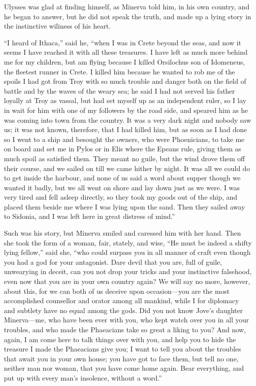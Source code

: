 Ulysses was glad at finding himself, as Minerva told him, in his own country,
and he began to answer, but he did not speak the truth, and made up a lying
story in the instinctive wiliness of his heart.

“I heard of Ithaca,” said he, “when I was in Crete beyond the seas, and now it
seems I have reached it with all these treasures. I have left as much more
behind me for my children, but am flying because I killed Orsilochus son of
Idomeneus, the fleetest runner in Crete. I killed him because he wanted to rob
me of the spoils I had got from Troy with so much trouble and danger both on
the field of battle and by the waves of the weary sea; he said I had not served
his father loyally at Troy as vassal, but had set myself up as an independent
ruler, so I lay in wait for him with one of my followers by the road side, and
speared him as he was coming into town from the country. It was a very dark
night and nobody saw us; it was not known, therefore, that I had killed him,
but as soon as I had done so I went to a ship and besought the owners, who were
Phoenicians, to take me on board and set me in Pylos or in Elis where the
Epeans rule, giving them as much spoil as satisfied them. They meant no guile,
but the wind drove them off their course, and we sailed on till we came hither
by night. It was all we could do to get inside the harbour, and none of us said
a word about supper though we wanted it badly, but we all went on shore and lay
down just as we were. I was very tired and fell asleep directly, so they took
my goods out of the ship, and placed them beside me where I was lying upon the
sand. Then they sailed away to Sidonia, and I was left here in great distress
of mind.”

Such was his story, but Minerva smiled and caressed him with her hand. Then she
took the form of a woman, fair, stately, and wise, “He must be indeed a shifty
lying fellow,” said she, “who could surpass you in all manner of craft even
though you had a god for your antagonist. Dare devil that you are, full of
guile, unwearying in deceit, can you not drop your tricks and your instinctive
falsehood, even now that you are in your own country again? We will say no
more, however, about this, for we can both of us deceive upon occasion—you are
the most accomplished counsellor and orator among all mankind, while I for
diplomacy and subtlety have no equal among the gods. Did you not know Jove’s
daughter Minerva—me, who have been ever with you, who kept watch over you in
all your troubles, and who made the Phaeacians take so great a liking to you?
And now, again, I am come here to talk things over with you, and help you to
hide the treasure I made the Phaeacians give you; I want to tell you about the
troubles that await you in your own house; you have got to face them, but tell
no one, neither man nor woman, that you have come home again. Bear everything,
and put up with every man’s insolence, without a word.”

